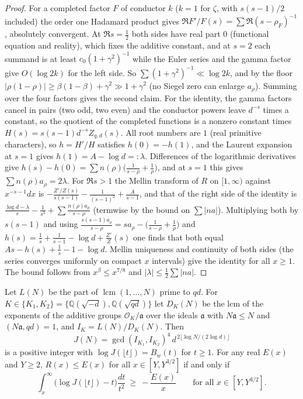 \begin{proof}
For a completed factor $F$ of conductor $k$ ($k=1$ for $\zeta$, with $s(s-1)/2$ included) the order one Hadamard product gives $\Re F'/F(s)=\sum\Re(s-\rho_F)^{-1}$, absolutely convergent. At $\Re s=\frac12$ both sides have real part $0$ (functional equation and reality), which fixes the additive constant, and at $s=2$ each summand is at least $c_0(1+\gamma^2)^{-1}$ while the Euler series and the gamma factor give $O(\log2k)$ for the left side. So $\sum(1+\gamma^2)^{-1}\ll\log2k$, and by the floor $|\rho(1-\rho)|\ge\beta(1-\beta)+\gamma^2\gg1+\gamma^2$ (no Siegel zero can enlarge $a_\rho$). Summing over the four factors gives the second claim. For the identity, the gamma factors cancel in pairs (two odd, two even) and the conductor powers leave $d^{-s}$ times a constant, so the quotient of the completed functions is a nonzero constant times $H(s)=s(s-1)d^{-s}Z_{q,d}(s)$. All root numbers are $1$ (real primitive characters), so $h=H'/H$ satisfies $h(0)=-h(1)$, and the Laurent expansion at $s=1$ gives $h(1)=A-\log d=:\lambda$. Differences of the logarithmic derivatives give $h(s)-h(0)=\sum n(\rho)\big(\frac1{s-\rho}+\frac1\rho\big)$, and at $s=1$ this gives $\sum n(\rho)a_\rho=2\lambda$. For $\Re s>1$ the Mellin transform of $R$ on $[1,\infty)$ against $x^{-s-1}dx$ is $-\frac{Z'/Z(s)}{s(s-1)}-\frac1{(s-1)^2}+\frac A{s-1}$, and that of the right side of the identity is $\frac{\log d-\lambda}s-\frac1{s^2}+\sum\frac{n(\rho)a_\rho}{s-\rho}$ (termwise by the bound on $\sum|na|$). Multiplying both by $s(s-1)$ and using $\frac{s(s-1)a_\rho}{s-\rho}=sa_\rho-\big(\frac1{s-\rho}+\frac1\rho\big)$ and $h(s)=\frac1s+\frac1{s-1}-\log d+\frac{Z'}Z(s)$ one finds that both equal $As-h(s)+\frac1s-1-\log d$. Mellin uniqueness and continuity of both sides (the series converges uniformly on compact $x$ intervals) give the identity for all $x\ge1$. The bound follows from $x^\beta\le x^{7/8}$ and $|\lambda|\le\frac12\sum|na|$.
\end{proof}

\begin{proposition}\label{mq:prop:integerJ}
Let $L(N)$ be the part of $\operatorname{lcm}(1,\dots,N)$ prime to $qd$. For $K\in\{K_1,K_2\}=\{\mathbb Q(\sqrt{-d}),\mathbb Q(\sqrt{qd})\}$ let $D_K(N)$ be the lcm of the exponents of the additive groups $\mathcal O_K/\mathfrak a$ over the ideals $\mathfrak a$ with $N\mathfrak a\le N$ and $(N\mathfrak a,qd)=1$, and $I_K=L(N)/D_K(N)$. Then
\[
J(N)=\gcd(I_{K_1},I_{K_2})^4\,d^{\,2\lfloor\log N/(2\log d)\rfloor}
\]
is a positive integer with $\log J(\lfloor t\rfloor)=B_w(t)$ for $t\ge1$. For any real $E(x)$ and $Y\ge2$, $R(x)\le E(x)$ for all $x\in[Y,Y^{3/2}]$ if and only if
\[
\int_x^\infty\big(\log J(\lfloor t\rfloor)-t\big)\frac{dt}{t^2}\ \ge\ -\frac{E(x)}x\qquad\text{for all }x\in[Y,Y^{3/2}].
\]
\end{proposition}

